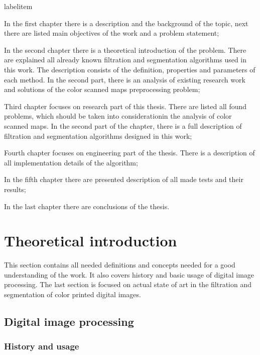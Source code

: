 \documentclass[a4paper,onecolumn,oneside,12pt]{memoir}
\makeatletter
\renewenvironment{itemize}{
  \begin{list}{  
  \csname labelitem\romannumeral\the\@listdepth\endcsname}{
  \setlength{\leftmargin}{1em}
	\setlength{\topsep}{6pt}%
	\setlength{\partopsep}{0pt}%
	\setlength{\parskip}{0pt}%
	\setlength{\parsep}{0pt}%
	\setlength{\itemsep}{0pt}}
}{
  \end{list}
}
\makeatother
\begin{document}
\begin{itemize}
  \item In the first chapter there is a description and the background of the topic, 
        next there are listed main objectives of the work and a problem statement;
  \item In the second chapter there is a theoretical introduction of the problem. There are
        explained all already known filtration and segmentation algorithms used in this work.
        The description consists of the definition, properties and parameters of each method. In the
        second part, there is an analysis of existing research work and solutions of the color
        scanned maps preprocessing problem;
  \item Third chapter focuses on research part of this thesis. There are listed all found problems,
        which should be taken into considerationin the analysis of color scanned maps. In the second
        part of the chapter, there is a full description of filtration and segmentation algorithms
        designed in this work;
  \item Fourth chapter focuses on engineering part of the thesis. There is a description of all
        implementation details of the algorithm;
  \item In the fifth chapter there are presented description of all made tests and their results;
  \item In the last chapter there are conclusions of the thesis.
\end{itemize}

\chapter{Theoretical introduction}

This section contains all needed definitions and concepts needed for a good understanding of the
work. It also covers history and basic usage of digital image processing. The last section is 
focused on actual state of art in the filtration and segmentation of color printed digital images.

\section{Digital image processing}

\subsection{History and usage}
\end{document}
